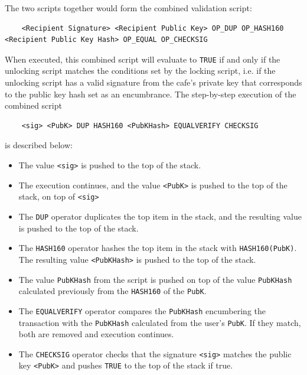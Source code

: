 \documentclass{article}
\begin{document}
    The two scripts together would form the combined validation script:

    \begin{lstlisting}
    <Recipient Signature> <Recipient Public Key> OP_DUP OP_HASH160 <Recipient Public Key Hash> OP_EQUAL OP_CHECKSIG
    \end{lstlisting}

    When executed, this combined script will evaluate to \texttt{TRUE} if and only if the unlocking script matches the conditions set by the locking script, i.e. if the unlocking script has a valid signature from the cafe's private key that corresponds to the public key hash set as an encumbrance. The step-by-step execution of the combined script

    \begin{lstlisting}
    <sig> <PubK> DUP HASH160 <PubKHash> EQUALVERIFY CHECKSIG
    \end{lstlisting}

    is described below:

    \begin{itemize}
      \item The value \texttt{<sig>} is pushed to the top of the stack.
      \item The execution continues, and the value \texttt{<PubK>} is pushed to the top of the stack, on top of \texttt{<sig>}
      \item The \texttt{DUP} operator duplicates the top item in the stack, and the resulting value is pushed to the top of the stack.
      \item The \texttt{HASH160} operator hashes the top item in the stack with \texttt{HASH160(PubK)}. The resulting value \texttt{<PubKHash>} is pushed to the top of the stack.
      \item The value \texttt{PubKHash} from the script is pushed on top of the value \texttt{PubKHash} calculated previously from the \texttt{HASH160} of the \texttt{PubK}.
      \item The \texttt{EQUALVERIFY} operator compares the \texttt{PubKHash} encumbering the transaction with the \texttt{PubKHash} calculated from the user's \texttt{PubK}. If they match, both are removed and execution continues.
      \item The \texttt{CHECKSIG} operator checks that the signature \texttt{<sig>} matches the public key \texttt{<PubK>} and pushes \texttt{TRUE} to the top of the stack if true.
    \end{itemize}
\end{document}
